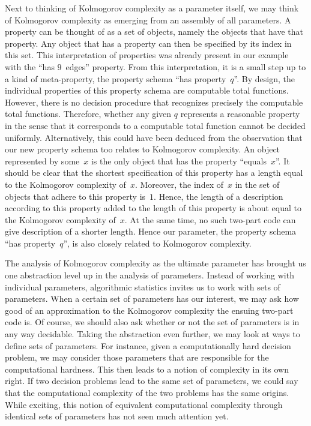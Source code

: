 Next to thinking of Kolmogorov complexity as a parameter itself, we may think of Kolmogorov complexity as emerging from an assembly of all parameters.
A property can be thought of as a set of objects, namely the objects that have that property.
Any object that has a property can then be specified by its index in this set.
This interpretation of properties was already present in our example with the \enquote{has $9$~edges} property.
From this interpretation, it is a small step up to a kind of meta-property, the property schema \enquote{has property~$q$}.
By design, the individual properties of this property schema are computable total functions.
However, there is no decision procedure that recognizes precisely the computable total functions.
Therefore, whether any given $q$ represents a reasonable property in the sense that it corresponds to a computable total function cannot be decided uniformly.
Alternatively, this could have been deduced from the observation that our new property schema too relates to Kolmogorov complexity.
An object represented by some~$x$ is the only object that has the property \enquote{equals~$x$}.
It should be clear that the shortest specification of this property has a length equal to the Kolmogorov complexity of~$x$.
Moreover, the index of~$x$ in the set of objects that adhere to this property is~$1$.
Hence, the length of a description according to this property added to the length of this property is about equal to the Kolmogorov complexity of~$x$.
At the same time, no such two-part code can give description of a shorter length.
Hence our parameter, the property schema \enquote{has property~$q$}, is also closely related to Kolmogorov complexity.

The analysis of Kolmogorov complexity as the ultimate parameter has brought us one abstraction level up in the analysis of parameters.
Instead of working with individual parameters, algorithmic statistics invites us to work with sets of parameters.
When a certain set of parameters has our interest, we may ask how good of an approximation to the Kolmogorov complexity the ensuing two-part code is.
Of course, we should also ask whether or not the set of parameters is in any way decidable.
Taking the abstraction even further, we may look at ways to define sets of parameters.
For instance, given a computationally hard decision problem, we may consider those parameters that are responsible for the computational hardness.
This then leads to a notion of complexity in its own right.
If two decision problems lead to the same set of parameters, we could say that the computational complexity of the two problems has the same origins.
While exciting, this notion of equivalent computational complexity through identical sets of parameters has not seen much attention yet.

